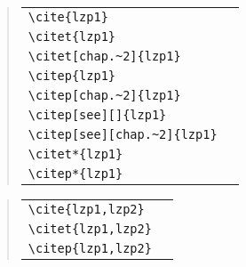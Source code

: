 \begin{quote}
\begin{tabular}{l@{\quad$\Rightarrow$\quad}l}
  \verb|\cite{lzp1}| & \cite{lzp1}\\
  \verb|\citet{lzp1}| & \citet{lzp1}\\
  \verb|\citet[chap.~2]{lzp1}| & \citet[chap.~2]{lzp1}\\[0.5ex]
  \verb|\citep{lzp1}| & \citep{lzp1}\\
  \verb|\citep[chap.~2]{lzp1}| & \citep[chap.~2]{lzp1}\\
  \verb|\citep[see][]{lzp1}| & \citep[see][]{lzp1}\\
  \verb|\citep[see][chap.~2]{lzp1}| & \citep[see][chap.~2]{lzp1}\\[0.5ex]
  \verb|\citet*{lzp1}| & \citet*{lzp1}\\
  \verb|\citep*{lzp1}| & \citep*{lzp1}
\end{tabular}
\end{quote}
\begin{quote}
\begin{tabular}{l@{\quad$\Rightarrow$\quad}l}
  \verb|\cite{lzp1,lzp2}| & \cite{lzp1,lzp2}\\
  \verb|\citet{lzp1,lzp2}| & \citet{lzp1,lzp2}\\
  \verb|\citep{lzp1,lzp2}| & \citep{lzp1,lzp2}
\end{tabular}
\end{quote}




\nocite{test1, test2}


